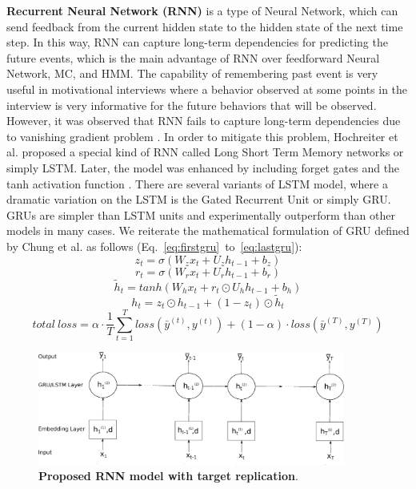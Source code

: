 \documentclass{amia_summit_2018}
\begin{document}
\textbf {Recurrent Neural Network (RNN)} is a type of Neural Network, which can send feedback from the current hidden state to the hidden state of the next time step. In this way, RNN can capture long-term dependencies for predicting the future events, which is the main advantage of RNN over feedforward Neural Network, MC, and HMM. The capability of remembering past event is very useful in motivational interviews where a behavior observed at some points in the interview is very informative for the future behaviors that will be observed. However, it was observed that RNN fails to capture long-term dependencies due to vanishing gradient problem \cite{bengio1993problem}. In order to mitigate this problem, Hochreiter et al.\cite{hochreiter1997long} proposed a special kind of RNN called Long Short Term Memory networks or simply LSTM. Later, the model was enhanced by including forget gates and the tanh activation function \cite{graves2013speech}. There are several variants of LSTM model, where a dramatic variation on the LSTM is the Gated Recurrent Unit\cite{cho2014properties} or simply GRU. GRUs are simpler than LSTM units and experimentally outperform than other models in many cases. We reiterate the mathematical formulation of GRU defined by Chung et al.\cite{chung2014empirical} as follows (Eq.~\ref{eq:firstgru}~to~\ref{eq:lastgru}):
\begin{equation}
z_t = \sigma(W_zx_t + U_zh_{t-1} + b_z)
\label{eq:firstgru}
\end{equation}
\begin{equation}
r_t = \sigma(W_rx_t + U_rh_{t-1} + b_r)
\end{equation}
\begin{equation}
\tilde h_t = tanh(W_hx_t + r_t \odot U_hh_{t-1} + b_h) 
\end{equation}
\begin{equation}
h_t = z_t \odot h_{t-1} + (1-z_t) \odot \tilde h_t
\label{eq:lastgru}
\end{equation}  
\begin{equation}
total\ loss = \alpha \cdot \frac{1}{T}\sum_{t=1}^T loss(\bar y^{(t)},y^{(t)}) + (1 - \alpha) \cdot loss(\bar y^{(T)},y^{(T)})
\label{eq:loss}
\end{equation}  
\begin{figure}[!htb]
    \centering
    \includegraphics[width=0.90\textwidth]{figures/rnn.eps}
    \caption{\textbf{Proposed RNN model with target replication}.}
    \label{fig:rnn-model}
\end{figure}
\end{document}
